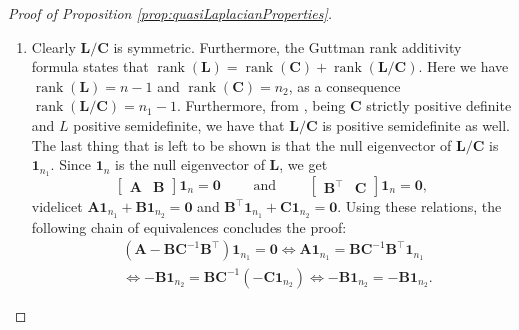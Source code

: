 \documentclass[12pt]{article}
\theoremstyle{plain}
\theoremstyle{remark}
\newcommand{\curly}[1]{\left\{ #1 \right\}}
\newcommand{\R}[0]{\mathbb{R}}
\newcommand{\onen}[0]{{\mathbf{1}_{n}}}
\newcommand{\dVec}[1]{{\bm{#1}}}            %
\newcommand{\latMatr}[1]{\mathbf{#1}}          %
\DeclareMathOperator{\rank}{rank}
\begin{document}
\begin{proof}[Proof of Proposition \ref{prop:quasiLaplacianProperties}]
\begin{enumerate}
\begin{align*}
            \end{align*}
            If $\dVec x^\top {\latMatr{B}} \dVec y\ne 0$, we can find a suitable $\gamma$ that contradicts the previous inequality. Hence $\dVec x^\top {\latMatr{B}} \dVec y=0$ and therefore, being $\dVec x$ arbitrary, ${\latMatr{B}} \dVec y=\dVec 0$. Consider now the vector $\dVec z:=(0,...,0,\dVec y^\top)^\top$: we have ${\latMatr{L}}\dVec z=\dVec 0$, but clearly $\dVec z$ does not lie in the null space of $\latMatr L$, which is $\curly{\lambda \onen\,:\,\lambda\in \R}$. Contradiction.
            \item Clearly ${\latMatr{L}}/{\latMatr{C}}$ is symmetric. Furthermore, the Guttman rank additivity formula \cite[Equation 0.9.2]{zhang_schur_2005} states that $\rank ({\latMatr{L}})=\rank ({\latMatr{C}}) + \rank({\latMatr{L}}/{\latMatr{C}})$. Here we have $\rank ({\latMatr{L}})=n-1$ and $\rank ({\latMatr{C}})=n_2$, as a consequence $\rank ({\latMatr{L}}/{\latMatr{C}})=n_1-1$. Furthermore, from \citet[Theorem 1.12]{zhang_schur_2005}, being ${\latMatr{C}}$ strictly positive definite and $L$ positive semidefinite, we have that ${\latMatr{L}}/{\latMatr{C}}$ is positive semidefinite as well. The last thing that is left to be shown is that the null eigenvector of ${\latMatr{L}}/{\latMatr{C}}$ is ${\dVec 1}_{n_1}$. Since $\onen$ is the null eigenvector of $\latMatr L$, we get
            \begin{equation*}
                \begin{bmatrix}
                    {\latMatr{A}} & {\latMatr{B}}
                \end{bmatrix}\onen=\dVec 0
                \qquad \text{ and }\qquad \begin{bmatrix}
                    {\latMatr{B}}^\top & {\latMatr{C}}
                \end{bmatrix}\onen=\dVec 0,
            \end{equation*}
            videlicet ${\latMatr{A}} \dVec{1}_{n_1}+{\latMatr{B}} \dVec{1}_{n_2}=\dVec 0$ and ${\latMatr{B}}^\top \dVec{1}_{n_1}+{\latMatr{C}} \dVec{1}_{n_2}=\dVec 0$. Using these relations, the following chain of equivalences concludes the proof:
            \begin{align*}
                &({\latMatr{A}}-{\latMatr{B}} {\latMatr{C}}^{-1} {\latMatr{B}}^\top) \mathbf{1}_{n_1}= \dVec 0 \iff
                {\latMatr{A}} \mathbf{1}_{n_1} = {\latMatr{B}} {\latMatr{C}}^{-1} {\latMatr{B}}^\top \dVec{1}_{n_1}\\
                & \iff -{\latMatr{B}} \dVec{1}_{n_2}={\latMatr{B}} {\latMatr{C}}^{-1}(-{\latMatr{C}} \dVec{1}_{n_2}) \iff -{\latMatr{B}} \dVec{1}_{n_2} = -{\latMatr{B}} \dVec{1}_{n_2}.

\end{align*}
\end{enumerate}
\end{proof}
\end{document}
